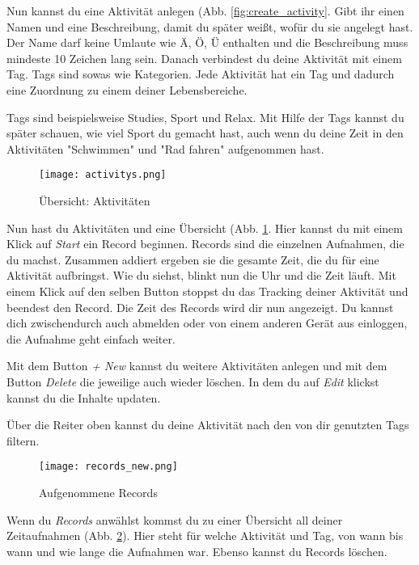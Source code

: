 Nun kannst du eine Aktivität anlegen (Abb. \ref{fig:create_activity}. 
Gibt ihr einen Namen und eine Beschreibung, damit du später weißt, wofür du sie angelegt hast. 
Der Name darf keine Umlaute wie \glqq Ä, Ö, Ü\grqq{}  enthalten und die Beschreibung muss mindeste 10 Zeichen lang sein. 
Danach verbindest du deine Aktivität mit einem Tag. Tags sind sowas wie Kategorien. 
Jede Aktivität hat ein Tag und dadurch eine Zuordnung zu einem deiner Lebensbereiche. 

Tags sind beispielsweise Studies, Sport und Relax. 
Mit Hilfe der Tags kannst du später schauen, wie viel Sport du gemacht hast, auch wenn du deine Zeit in den Aktivitäten "Schwimmen" und "Rad fahren" aufgenommen hast. 


\begin{figure}[H]
	\hspace{-1.5cm}
	\centering
	\texttt{[image: activitys.png]}
	\caption{Übersicht: Aktivitäten}
	\label{fig:activitys}
\end{figure}

Nun hast du Aktivitäten und eine Übersicht (Abb. \ref{fig:activitys}. Hier kannst du mit einem Klick auf  \textit{Start}  ein Record beginnen. Records sind die einzelnen Aufnahmen, die du machst. Zusammen addiert ergeben sie die gesamte Zeit, die du für eine Aktivität aufbringst. Wie du siehst, blinkt nun die Uhr und die Zeit läuft. 
Mit einem Klick auf den selben Button stoppst du das Tracking deiner Aktivität und beendest den Record. Die Zeit des Records wird dir nun angezeigt.
 Du kannst dich zwischendurch auch abmelden oder von einem anderen Gerät aus einloggen, die Aufnahme geht einfach weiter. 

Mit dem Button \textit{+ New} kannst du weitere Aktivitäten anlegen und mit dem Button \textit{Delete} die jeweilige auch wieder löschen. In dem du auf \textit{Edit} klickst kannst du die Inhalte updaten. 

Über die Reiter oben kannst du deine Aktivität nach den von dir genutzten Tags filtern. 

\begin{figure}[H]
	\hspace{-1.5cm}
	\centering
	\texttt{[image: records\_new.png]}
	\caption{Aufgenommene Records}
	\label{fig:records}
\end{figure}

Wenn du \textit{Records} anwählst kommst du zu einer Übersicht all deiner Zeitaufnahmen (Abb. \ref{fig:records}). Hier steht für welche Aktivität und Tag, von wann bis wann und wie lange die Aufnahmen war. Ebenso kannst du Records löschen. 

